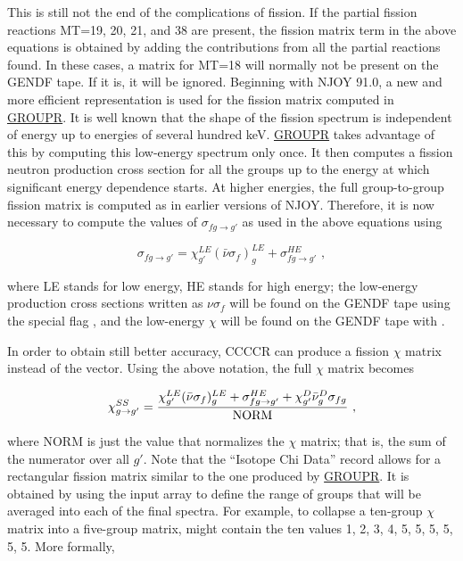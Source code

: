 This is still not the end of the complications of fission.  If the
partial fission reactions MT=19, 20, 21, and 38 are present, the fission
matrix term in the above equations is obtained by adding the contributions
from all the partial reactions found.  In these cases, a matrix for
MT=18 will normally  not be present on the GENDF tape.  If it is, it will
be ignored.  Beginning with NJOY 91.0, a new and more efficient
representation is used for the fission matrix computed in
\hyperlink{sGROUPRhy}{GROUPR}.  It is well known that the shape
of the fission spectrum is independent of energy up to energies of
several hundred keV.  \hyperlink{sGROUPRhy}{GROUPR} takes advantage
of this by computing this low-energy spectrum only once.  It then
computes a fission neutron production cross section for all the groups
up to the energy at which significant energy dependence starts.  At
higher energies, the full group-to-group fission matrix is computed as
in earlier versions of NJOY.  Therefore, it is now necessary to compute
the values of $\sigma_{fg\rightarrow g'}$ as used in the above equations
using

\begin{equation}
   \sigma_{fg\rightarrow g'}=\chi^{LE}_{g'}(\bar{\nu}\sigma_f)^{LE}_g
     +\sigma^{HE}_{fg\rightarrow g'} \,\,,
\end{equation}

\noindent
where LE stands for low energy, HE stands for high energy; the
low-energy production cross sections written as $\nu\sigma_f$ will be
found on the GENDF tape using the special flag , and the
low-energy $\chi$ will be found on the GENDF tape with .

In order to obtain still better accuracy, CCCCR can produce
a fission $\chi$ matrix instead of the vector.  Using the above
notation, the full $\chi$ matrix becomes

\begin{equation}
   \chi^{SS}_{g\rightarrow g'}=\frac{\chi^{LE}_{g'}(\bar{\nu}\sigma_f)^{LE}_g
     +\sigma^{HE}_{fg\rightarrow g'}+\chi^D_{g'}\bar{\nu}^D_g\sigma_{fg}}
      {{\rm NORM}} \,\,,
\end{equation}

\noindent
where NORM is just the value that normalizes the $\chi$ matrix; that is,
the sum of the numerator over all $g'$.  Note that the ``Isotope Chi
Data'' record allows for a rectangular fission matrix similar to the
one produced by \hyperlink{sGROUPRhy}{GROUPR}.  It is obtained
by using the input  array to define the range of groups
that will be averaged into each
of the final  spectra.  For example, to collapse a
ten-group $\chi$ matrix into a five-group matrix,  might
contain the ten values 1, 2, 3, 4, 5, 5, 5, 5, 5, 5. More formally,

